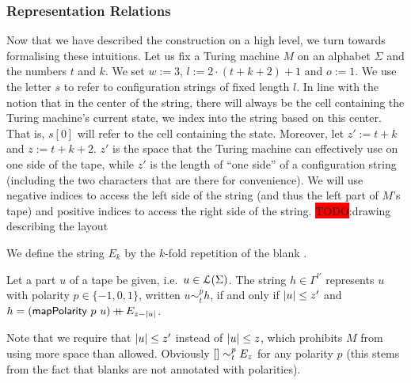 \documentclass[a4paper,UKenglish,cleveref, autoref]{lipics-v2019}
\newcommand{\TODO}[1]{\colorbox{red}{\LARGE TODO}:#1}
\begin{document}
\subsubsection{Representation Relations}
Now that we have described the construction on a high level, we turn towards formalising these intuitions. 
Let us fix a Turing machine $M$ on an alphabet $\Sigma$  and the numbers $t$ and $k$. We set $w := 3$, $l := 2\cdot (t + k + 2) + 1$ and $o := 1$. 
We use the letter $s$ to refer to configuration strings of fixed length $l$. In line with the notion that in the center of the string, there will always be the cell containing the Turing machine's current state, we index into the string based on this center. That is, $s[0]$ will refer to the cell containing the state. 
Moreover, let $z' := t + k$ and $z := t + k + 2$. $z'$ is the space that the Turing machine can effectively use on one side of the tape, while $z'$ is the length of ``one side'' of a configuration string (including the two characters that are there for convenience). 
We will use negative indices to access the left side of the string (and thus the left part of $M$'s tape) and positive indices to access the right side of the string. 
\TODO{drawing describing the layout}

\newcommand{\reprt}[1]{\ensuremath{\sim_t^{#1}}}
\newcommand{\reprc}{\ensuremath{\sim_c}}

We define the string $E_k$ by the $k$-fold repetition of the blank \blank.

\begin{definition}
  Let a part $u$ of a tape be given, i.e.\ $u \in \mathcal{L} (\Sigma)$. The string $h \in \Gamma^{l'}$ represents $u$ with polarity $p \in \{-1, 0, 1\}$, written $u \reprt{p} h$, if and only if $|u| \le z' $ and $h = (\textsf{mapPolarity}~p~u) \mathop{{+}\!\!\!{+}} E_{z-|u|}$.
\end{definition}

Note that we require that $|u| \le z'$ instead of $|u| \le z$, which prohibits $M$ from using more space than allowed. 
Obviously $\nil \reprt{p} E_{z}$ for any polarity $p$ (this stems from the fact that blanks are not annotated with polarities).
\end{document}
